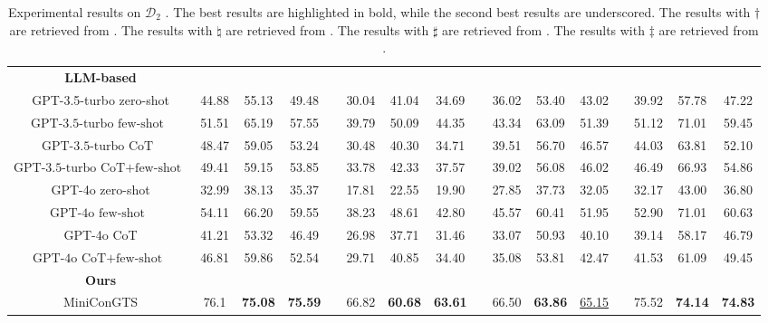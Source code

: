\documentclass[11pt]{article}
\begin{document}
\begin{table}[ht]
{\begin{tabular}{cccccccccccccccc}
    \textbf{LLM-based} &       &       &       &       &       &       &       &       &       &       &       &       &       &       &  \\
    GPT-3.5-turbo zero-shot  & 44.88     & 55.13     & 49.48 &       & 30.04     & 41.04     & 34.69 &       & 36.02     & 53.40     & 43.02 &       & 39.92     & 57.78     & 47.22 \\
    $\textrm{GPT-3.5-turbo few-shot}$\  & 51.51     & 65.19     & 57.55 &       & 39.79     & 50.09     & 44.35 &       & 43.34     & 63.09     & 51.39 &       & 51.12     & 71.01     & 59.45 \\
    $\textrm{GPT-3.5-turbo CoT}$\  & 48.47     & 59.05     & 53.24 &       & 30.48     & 40.30     & 34.71 &       & 39.51     & 56.70     & 46.57 &       & 44.03     & 63.81     & 52.10 \\
    $\textrm{GPT-3.5-turbo CoT+few-shot}$\  & 49.41     & 59.15     & 53.85 &       & 33.78     & 42.33     & 37.57 &       & 39.02     & 56.08     & 46.02 &       & 46.49     & 66.93     & 54.86 \\
    \textrm{GPT-4o zero-shot}  & 32.99 & 38.13 & 35.37 &       & 17.81 & 22.55 & 19.90 &       & 27.85 & 37.73 & 32.05 &       & 32.17 & 43.00 & 36.80 \\
    $\textrm{GPT-4o few-shot}$\  & 54.11 & 66.20 & 59.55 &       & 38.23 & 48.61 & 42.80 &       & 45.57 & 60.41 & 51.95 &       & 52.90 & 71.01 & 60.63 \\
    \textrm{GPT-4o CoT}  & 41.21 & 53.32 & 46.49 &       & 26.98 & 37.71 & 31.46 &       & 33.07 & 50.93 & 40.10 &       & 39.14 & 58.17 & 46.79 \\
    $\textrm{GPT-4o CoT+few-shot}$\  & 46.81 & 59.86 & 52.54 &       & 29.71 & 40.85 & 34.40 &       & 35.08 & 53.81 & 42.47 &       & 41.53 & 61.09 & 49.45 \\
    \midrule
    
    \textbf{Ours} &       &       &       &       &       &       &       &       &       &       &       &       &       &       &  \\
       MiniConGTS   & 76.1  & \textbf{75.08} & \textbf{75.59} &       & 66.82 & \textbf{60.68} & \textbf{63.61}&       & 66.50 & \textbf{63.86} & \underline{65.15} &       & 75.52 & \textbf{74.14} & \textbf{74.83} \\
    \bottomrule
    \hline
    \end{tabular}%
    }
\caption{Experimental results on $\mathcal{D}_2$ \cite{xu2020position}. 
The best results are highlighted in bold,  while the second best results are underscored. 
The results with $\dagger$ are retrieved from \cite{yu2021aspect}. 
The results with $\natural$ are retrieved from \cite{xu2020position}. 
The results with $\sharp$ are retrieved from \cite{peng2020knowing}. 
The results with $\ddagger$ are retrieved from \cite{mao2021joint}. 
}

\label{tab:D2performance}
\end{table}
\end{document}
